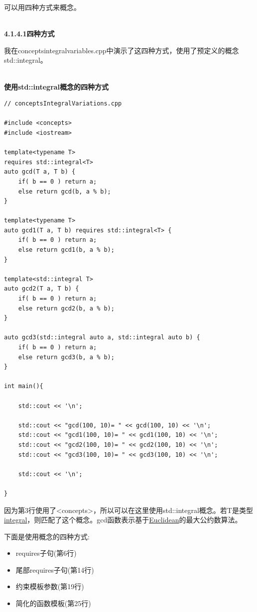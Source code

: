 
可以用四种方式来概念。

\hspace*{\fill} \\ %
\noindent
\textbf{4.1.4.1\hspace{0.2cm}四种方式}

我在conceptsintegralvariables.cpp中演示了这四种方式，使用了预定义的概念std::integral。

\hspace*{\fill} \\ %
\noindent
\textbf{使用std::integral概念的四种方式}
\begin{lstlisting}[style=styleCXX]
// conceptsIntegralVariations.cpp

#include <concepts>
#include <iostream>

template<typename T>
requires std::integral<T>
auto gcd(T a, T b) {
	if( b == 0 ) return a;
	else return gcd(b, a % b);
}

template<typename T>
auto gcd1(T a, T b) requires std::integral<T> {
	if( b == 0 ) return a;
	else return gcd1(b, a % b);
}

template<std::integral T>
auto gcd2(T a, T b) {
	if( b == 0 ) return a;
	else return gcd2(b, a % b);
}

auto gcd3(std::integral auto a, std::integral auto b) {
	if( b == 0 ) return a;
	else return gcd3(b, a % b);
}

int main(){

	std::cout << '\n';

	std::cout << "gcd(100, 10)= " << gcd(100, 10) << '\n';
	std::cout << "gcd1(100, 10)= " << gcd1(100, 10) << '\n';
	std::cout << "gcd2(100, 10)= " << gcd2(100, 10) << '\n';
	std::cout << "gcd3(100, 10)= " << gcd3(100, 10) << '\n';

	std::cout << '\n';

}
\end{lstlisting}

因为第3行使用了<concepts>，所以可以在这里使用std::integral概念。若T是类型\href{https://en.cppreference.com/w/cpp/types/is_integral}{integral}，则匹配了这个概念。gcd函数表示基于\href{https://en.wikipedia.org/wiki/Euclid}{Euclidean}的最大公约数算法。

下面是使用概念的四种方式:

\begin{itemize}
\item
requires子句(第6行)

\item
尾部requires子句(第14行)

\item
约束模板参数(第19行)

\item
简化的函数模板(第25行)
\end{itemize}


